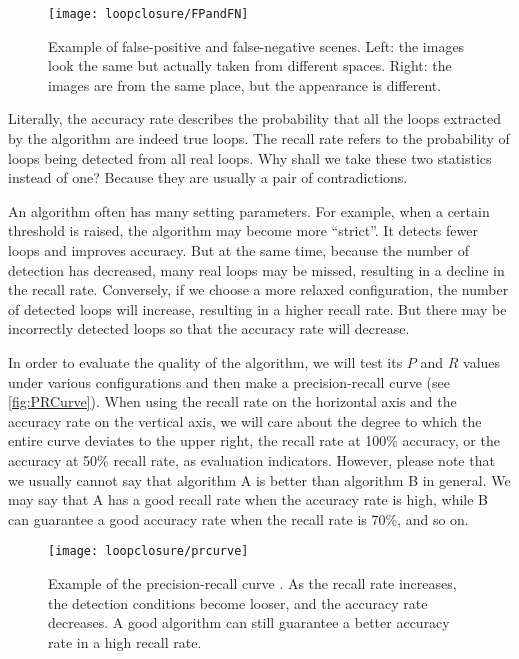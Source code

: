 \begin{figure}[!htp]
	\centering
	\texttt{[image: loopclosure/FPandFN]}
	\caption{Example of false-positive and false-negative scenes. Left: the images look the same but actually taken from different spaces. Right: the images are from the same place, but the appearance is different.}
	\label{fig:FPandFN}
\end{figure}

Literally, the accuracy rate describes the probability that all the loops extracted by the algorithm are indeed true loops. The recall rate refers to the probability of loops being detected from all real loops. Why shall we take these two statistics instead of one? Because they are usually a pair of contradictions.

An algorithm often has many setting parameters. For example, when a certain threshold is raised, the algorithm may become more ``strict''. It detects fewer loops and improves accuracy. But at the same time, because the number of detection has decreased, many real loops may be missed, resulting in a decline in the recall rate. Conversely, if we choose a more relaxed configuration, the number of detected loops will increase, resulting in a higher recall rate. But there may be incorrectly detected loops so that the accuracy rate will decrease.

In order to evaluate the quality of the algorithm, we will test its $P$ and $R$ values under various configurations and then make a precision-recall curve (see \autoref{fig:PRCurve}). When using the recall rate on the horizontal axis and the accuracy rate on the vertical axis, we will care about the degree to which the entire curve deviates to the upper right, the recall rate at 100\% accuracy, or the accuracy at 50\% recall rate, as evaluation indicators. However, please note that we usually cannot say that algorithm A is better than algorithm B in general. We may say that A has a good recall rate when the accuracy rate is high, while B can guarantee a good accuracy rate when the recall rate is 70\%, and so on.

\begin{figure}[!ht]
	\centering
	\texttt{[image: loopclosure/prcurve]}
	\caption{Example of the precision-recall curve {\cite{Gao2015a}}. As the recall rate increases, the detection conditions become looser, and the accuracy rate decreases. A good algorithm can still guarantee a better accuracy rate in a high recall rate.}
	\label{fig:PRCurve}
\end{figure}

